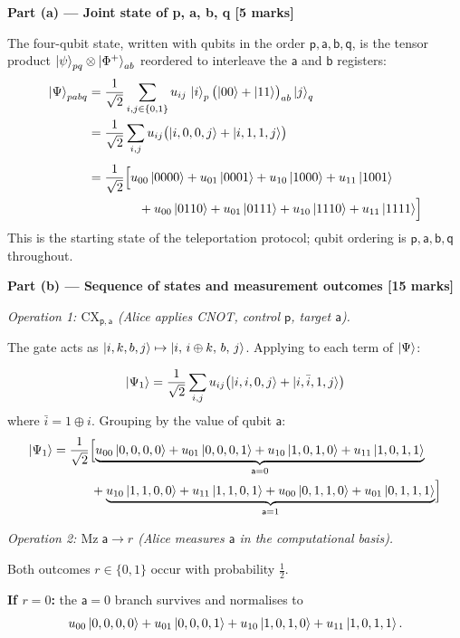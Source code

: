 \documentclass[12pt,a4paper]{article}
\begin{document}
\medskip
\textbf{Part (a) --- Joint state of p, a, b, q [5 marks]}

\medskip
The four-qubit state, written with qubits in the order $\mathsf{p,a,b,q}$, is the tensor product
$\ket{\psi}_{pq}\otimes\ket{\Phi^+}_{ab}$ reordered to interleave the $\mathsf{a}$ and $\mathsf{b}$ registers:
\begin{align*}
\ket{\Psi}_{pabq}
  &= \frac{1}{\sqrt{2}}\sum_{i,j\in\{0,1\}}u_{ij}\,\ket{i}_{p}\bigl(\ket{00}+\ket{11}\bigr)_{ab}\ket{j}_{q} \\
  &= \frac{1}{\sqrt{2}}\sum_{i,j}u_{ij}\bigl(\ket{i,0,0,j}+\ket{i,1,1,j}\bigr) \\[4pt]
  &= \frac{1}{\sqrt{2}}\Bigl[
      u_{00}\ket{0000}+u_{01}\ket{0001}+u_{10}\ket{1000}+u_{11}\ket{1001} \\
  &\qquad\qquad
     +u_{00}\ket{0110}+u_{01}\ket{0111}+u_{10}\ket{1110}+u_{11}\ket{1111}
     \Bigr]
\end{align*}
This is the starting state of the teleportation protocol; qubit ordering is $\mathsf{p,a,b,q}$ throughout.

\medskip
\textbf{Part (b) --- Sequence of states and measurement outcomes [15 marks]}

\medskip
\textit{Operation 1: $\mathrm{CX}_{\mathsf{p},\mathsf{a}}$ (Alice applies CNOT, control $\mathsf{p}$, target $\mathsf{a}$).}

The gate acts as $\ket{i,k,b,j}\mapsto\ket{i,\,i\oplus k,\,b,\,j}$.
Applying to each term of $\ket{\Psi}$:

\[
  \ket{\Psi_1}
  = \frac{1}{\sqrt{2}}\sum_{i,j}u_{ij}\bigl(\ket{i,i,0,j}+\ket{i,\bar{i},1,j}\bigr)
\]
where $\bar{i}=1\oplus i$. Grouping by the value of qubit $\mathsf{a}$:
\begin{align*}
\ket{\Psi_1}
  &= \frac{1}{\sqrt{2}}\Bigl[
      \underbrace{u_{00}\ket{0,0,0,0}+u_{01}\ket{0,0,0,1}
                 +u_{10}\ket{1,0,1,0}+u_{11}\ket{1,0,1,1}}_{\mathsf{a}=0}\\
  &\qquad\quad
     +\underbrace{u_{10}\ket{1,1,0,0}+u_{11}\ket{1,1,0,1}
                 +u_{00}\ket{0,1,1,0}+u_{01}\ket{0,1,1,1}}_{\mathsf{a}=1}
     \Bigr]
\end{align*}

\medskip
\textit{Operation 2: $\mathrm{Mz}\;\mathsf{a}\to r$ (Alice measures $\mathsf{a}$ in the computational basis).}

Both outcomes $r\in\{0,1\}$ occur with probability $\tfrac{1}{2}$.

\textbf{If $r=0$:} the $\mathsf{a}=0$ branch survives and normalises to
\[
  u_{00}\ket{0,0,0,0}+u_{01}\ket{0,0,0,1}+u_{10}\ket{1,0,1,0}+u_{11}\ket{1,0,1,1}.
\]
\end{document}

